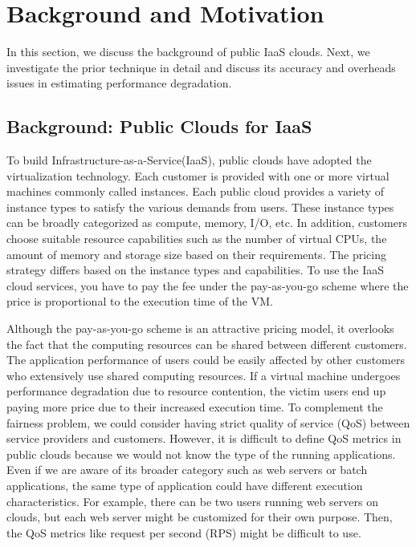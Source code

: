 \documentclass{sig-alternate}
\begin{document}
\section{Background and Motivation}
\label{sec:BackgroundandMotivation}

In this section, we discuss the background of public IaaS clouds. Next, we investigate the prior technique in detail and discuss its accuracy and overheads issues in estimating performance degradation.
\subsection{Background: Public Clouds for IaaS}
\label{subsec:Background:PublicCloudsforIaaS}

To build Infrastructure-as-a-Service(IaaS), public clouds have adopted the virtualization technology. Each customer is provided with one or more virtual machines commonly called instances. Each public cloud provides a variety of instance types to satisfy the various demands from users. These instance types can be broadly categorized as compute, memory, I/O, etc. In addition, customers choose suitable resource capabilities such as the number of virtual CPUs, the amount of memory and storage size based on their requirements. The pricing strategy differs based on the instance types and capabilities. To use the IaaS cloud services, you have to pay the fee under the pay-as-you-go scheme where the price is proportional to the execution time of the VM.

Although the pay-as-you-go scheme is an attractive pricing model, it overlooks the fact that the computing resources can be shared between different customers. The application performance of users could be easily affected by other customers who extensively use shared computing resources. If a virtual machine undergoes performance degradation due to resource contention, the victim users end up paying more price due to their increased execution time. To complement the fairness problem, we could consider having strict quality of service (QoS) between service providers and customers. However, it is difficult to define QoS metrics in public clouds because we would not know the type of the running applications. Even if we are aware of its broader category such as web servers or batch applications, the same type of application could have different execution characteristics. For example, there can be two users running web servers on clouds, but each web server might be customized for their own purpose. Then, the QoS metrics like request per second (RPS) might be difficult to use.
\end{document}
